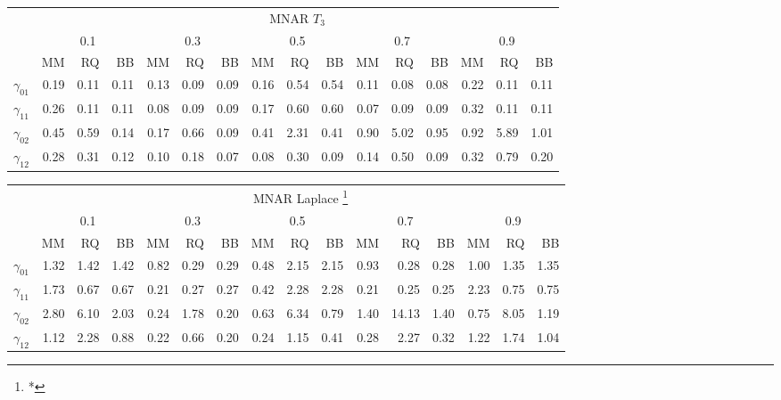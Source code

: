 \documentclass[12pt]{article}
\begin{document}
\begin{table}[h]
  \begin{tabular}{rrrrrrrrrrrrrrrr}
    \toprule
    & \multicolumn{15}{c}{MNAR $T_3$} \\
    \cline{2-16}
    &  \multicolumn{3}{c}{0.1} &  \multicolumn{3}{c}{0.3} &  \multicolumn{3}{c}{0.5} &
    \multicolumn{3}{c}{0.7} &  \multicolumn{3}{c}{0.9} \\
    \cline{2-16}
    & MM   & RQ   & BB   & MM   & RQ   & BB   & MM   & RQ   & BB   & MM   & RQ   & BB   & MM   & RQ   & BB   \\
    \hline
    $\gamma_{01}$ & 0.19 & 0.11 & 0.11 & 0.13 & 0.09 & 0.09 & 0.16 & 0.54 & 0.54 & 0.11 & 0.08 & 0.08 & 0.22 & 0.11 & 0.11 \\
    $\gamma_{11}$ & 0.26 & 0.11 & 0.11 & 0.08 & 0.09 & 0.09 & 0.17 & 0.60 & 0.60 & 0.07 & 0.09 & 0.09 & 0.32 & 0.11 & 0.11 \\
    $\gamma_{02}$ & 0.45 & 0.59 & 0.14 & 0.17 & 0.66 & 0.09 & 0.41 & 2.31 & 0.41 & 0.90 & 5.02 & 0.95 & 0.92 & 5.89 & 1.01 \\
    $\gamma_{12}$ & 0.28 & 0.31 & 0.12 & 0.10 & 0.18 & 0.07 & 0.08 & 0.30 & 0.09 & 0.14 & 0.50 & 0.09 & 0.32 & 0.79 & 0.20 \\
    \bottomrule
  \end{tabular}

  \begin{tabular}{rrrrrrrrrrrrrrrr}
    \toprule
    & \multicolumn{15}{c}{MNAR Laplace \footnote{*}} \\
    \cline{2-16}
    &  \multicolumn{3}{c}{0.1} &  \multicolumn{3}{c}{0.3} &  \multicolumn{3}{c}{0.5} &
    \multicolumn{3}{c}{0.7} &  \multicolumn{3}{c}{0.9} \\
    \cline{2-16}
    & MM   & RQ   & BB   & MM   & RQ   & BB   & MM   & RQ   & BB   & MM   & RQ   & BB   & MM   & RQ   & BB   \\
    \hline
    $\gamma_{01}$ & 1.32 & 1.42 & 1.42 & 0.82 & 0.29 & 0.29 & 0.48 & 2.15 & 2.15 & 0.93 & 0.28 & 0.28 & 1.00 & 1.35 & 1.35  \\
    $\gamma_{11}$ & 1.73 & 0.67 & 0.67 & 0.21 & 0.27 & 0.27 & 0.42 & 2.28 & 2.28 & 0.21 & 0.25 & 0.25 & 2.23 & 0.75 & 0.75  \\
    $\gamma_{02}$ & 2.80 & 6.10 & 2.03 & 0.24 & 1.78 & 0.20 & 0.63 & 6.34 & 0.79 & 1.40 & 14.13 & 1.40 & 0.75 & 8.05 & 1.19 \\
    $\gamma_{12}$ & 1.12 & 2.28 & 0.88 & 0.22 & 0.66 & 0.20 & 0.24 & 1.15 & 0.41 & 0.28 & 2.27 & 0.32 & 1.22 & 1.74 & 1.04  \\
    \bottomrule
  \end{tabular}

\end{table}
\end{document}
